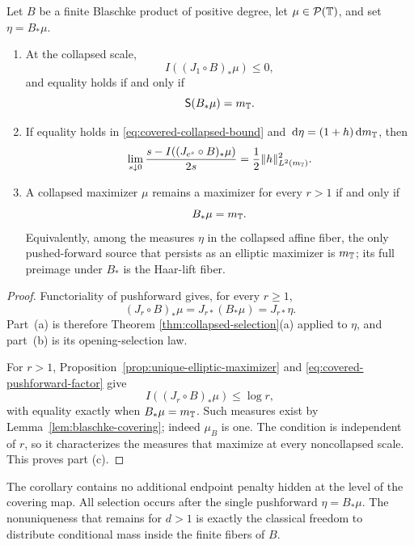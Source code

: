 \begin{corollary}
\label{cor:finite-blaschke-endpoint}
Let \(B\) be a finite Blaschke product of positive degree, let
\(\mu\in\mathcal P(\mathbb{T})\), and set \(\eta=B_\ast\mu\).

\begin{enumerate}[label=\textup{(\alph*)},leftmargin=*]
\item At the collapsed scale,
\begin{equation}\label{eq:covered-collapsed-bound}
 I((J_1\circ B)_\ast\mu)\leq0,
\end{equation}
and equality holds if and only if
\begin{equation}\label{eq:covered-collapsed-fiber}
 \mathsf S(B_\ast\mu)=m_{\mathbb{T}}.
\end{equation}

\item If equality holds in \eqref{eq:covered-collapsed-bound} and
\(\,\mathrm{d}\eta=(1+h)\,\mathrm{d} m_{\mathbb{T}}\), then
\begin{equation}\label{eq:covered-opening-law}
 \lim_{s\downarrow0}
 \frac{s-I((J_{e^s}\circ B)_\ast\mu)}{2s}
 =\frac12\|h\|_{L^2(m_{\mathbb{T}})}^2.
\end{equation}

\item A collapsed maximizer \(\mu\) remains a maximizer for every
\(r>1\) if and only if
\begin{equation}\label{eq:persistent-haar-lift}
 B_\ast\mu=m_{\mathbb{T}}.
\end{equation}
Equivalently, among the measures \(\eta\) in the collapsed affine fiber,
the only pushed-forward source that persists as an elliptic maximizer is
\(m_{\mathbb{T}}\); its full preimage under \(B_\ast\) is the Haar-lift fiber.
\end{enumerate}
\end{corollary}

\begin{proof}
Functoriality of pushforward gives, for every \(r\geq1\),
\begin{equation}\label{eq:covered-pushforward-factor}
 (J_r\circ B)_\ast\mu=J_{r\ast}(B_\ast\mu)=J_{r\ast}\eta.
\end{equation}
Part~\textup{(a)} is therefore Theorem
\ref{thm:collapsed-selection}\textup{(a)} applied to \(\eta\), and
part~\textup{(b)} is its opening-selection law.

For \(r>1\), Proposition~\ref{prop:unique-elliptic-maximizer} and
\eqref{eq:covered-pushforward-factor} give
\[
 I((J_r\circ B)_\ast\mu)\leq\log r,
\]
with equality exactly when \(B_\ast\mu=m_{\mathbb{T}}\).  Such measures exist
by Lemma~\ref{lem:blaschke-covering}; indeed \(\mu_B\) is one.  The
condition is independent of \(r\), so it characterizes the measures
that maximize at every noncollapsed scale.  This proves part
\textup{(c)}.
\end{proof}

The corollary contains no additional endpoint penalty hidden at the
level of the covering map.  All selection occurs after the single
pushforward \(\eta=B_\ast\mu\).  The nonuniqueness that remains for
\(d>1\) is exactly the classical freedom to distribute conditional mass
inside the finite fibers of \(B\).
